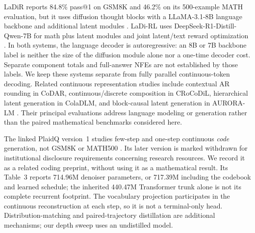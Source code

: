 LaDiR reports 84.8\% pass@1 on GSM8K and 46.2\% on its 500-example MATH evaluation, but it uses diffusion thought blocks with a LLaMA-3.1-8B language backbone and additional latent modules \citep{ladir}. LaDi-RL uses DeepSeek-R1-Distill-Qwen-7B for math plus latent modules and joint latent/text reward optimization \citep{ladirl}. In both systems, the language decoder is autoregressive: an 8B or 7B backbone label is neither the size of the diffusion module alone nor a one-time decoder cost. Separate component totals and full-answer NFEs are not established by those labels. We keep these systems separate from fully parallel continuous-token decoding. Related continuous representation studies include contextual AR rounding in CoDAR, continuous/discrete composition in CRoCoDiL, hierarchical latent generation in ColaDLM, and block-causal latent generation in AURORA-LM \citep{codar,crocodil,coladlm,auroralm}. Their principal evaluations address language modeling or generation rather than the paired mathematical benchmarks considered here.

The linked PlaidQ version~1 studies few-step and one-step continuous \emph{code} generation, not GSM8K or MATH500 \citep{plaidq}. Its later version is marked withdrawn for institutional disclosure requirements concerning research resources. We record it as a related coding preprint, without using it as a mathematical result. Its Table~3 reports 714.96M denoiser parameters, or 717.39M including the codebook and learned schedule; the inherited 440.47M Transformer trunk alone is not its complete recurrent footprint. The vocabulary projection participates in the continuous reconstruction at each step, so it is not a terminal-only head. Distribution-matching and paired-trajectory distillation are additional mechanisms; our depth sweep uses an undistilled model.
